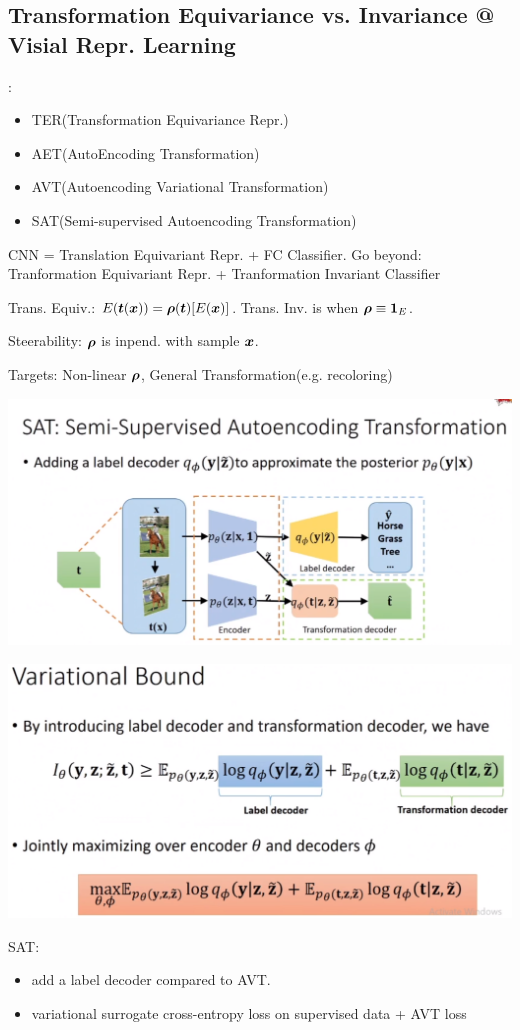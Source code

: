 \documentclass{article}
\begin{document}
\subsection{Transformation Equivariance vs. Invariance @ Visial Repr. Learning}
    :
    \begin{itemize}
        \item TER(Transformation Equivariance Repr.)
        \item AET(AutoEncoding Transformation)
        \item AVT(Autoencoding Variational Transformation)
        \item SAT(Semi-supervised Autoencoding Transformation)
    \end{itemize}

    CNN = Translation Equivariant Repr. + FC Classifier. Go beyond: Tranformation Equivariant Repr. + Tranformation Invariant Classifier

    Trans. Equiv.: $E(\boldsymbol{t}(\boldsymbol{x}))=\boldsymbol{\rho}(\boldsymbol{t})[E(\boldsymbol{x})]$. Trans. Inv. is when $\boldsymbol{\rho} \equiv \boldsymbol{1}_E$.

    Steerability: $\boldsymbol{\rho}$ is inpend. with sample $\boldsymbol{x}$.

    Targets: Non-linear $\boldsymbol{\rho}$, General Transformation(e.g. recoloring)

    \centerline{\includegraphics[width=0.8\paperwidth]{sat.PNG}}
    \centerline{\includegraphics[width=0.8\paperwidth]{sat-loss.PNG}}
    SAT:
    \begin{itemize}
        \item add a label decoder compared to AVT.
        \item variational surrogate \trarr cross-entropy loss on supervised data + AVT loss
    \end{itemize}
\end{document}
